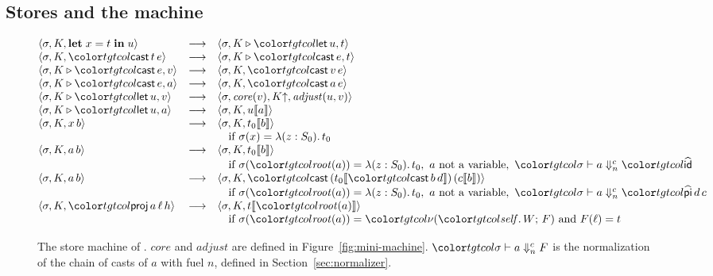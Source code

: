 \subsection{Stores and the machine}

\begin{figure}
\small
\color{tgtcol}
\[
\begin{array}{@{}lcll@{}}
\mst{\sigma}{K}{\klet x = t \kin u} &\step& \mst{\sigma}{K \triangleright \ev{let}\,u}{t} \\
\mst{\sigma}{K}{\ev{cast}\,t\,e} &\step& \mst{\sigma}{K \triangleright \ev{cast}\,e}{t} \\
\mst{\sigma}{K \triangleright \ev{cast}\,e}{v} &\step& \mst{\sigma}{K}{\ev{cast}\,v\,e} \\
\mst{\sigma}{K \triangleright \ev{cast}\,e}{a} &\step& \mst{\sigma}{K}{\ev{cast}\,a\,e} \\
\mst{\sigma}{K \triangleright \ev{let}\,u}{v} &\step& \mst{\sigma, \mathit{core}(v)}{\weak{K}}{\mathit{adjust}(u, v)} \\
\mst{\sigma}{K \triangleright \ev{let}\,u}{a} &\step& \mst{\sigma}{K}{\inst{u}{a}} \\
\mst{\sigma}{K}{x\,b} &\step& \mst{\sigma}{K}{\inst{t_0}{b}} \\
& & \quad \text{if } \sigma(x) = \lambda(z : S_0).\,t_0 \\
\mst{\sigma}{K}{a\,b} &\step& \mst{\sigma}{K}{\inst{t_0}{b}} \\
& & \quad \text{if } \sigma(\rt{a}) = \lambda(z : S_0).\,t_0,\ a \text{ not a variable},\ \chn{\sigma}{a}{n}{\form{id}} \\
\mst{\sigma}{K}{a\,b} &\step& \mst{\sigma}{K}{\ev{cast}\,(\inst{t_0}{\ev{cast}\,b\,d})\,(\inst{c}{b})} \\
& & \quad \text{if } \sigma(\rt{a}) = \lambda(z : S_0).\,t_0,\ a \text{ not a variable},\ \chn{\sigma}{a}{n}{\form{pi}\,d\,c} \\
\mst{\sigma}{K}{\ev{proj}\,a\,\ell\,h} &\step& \mst{\sigma}{K}{\inst{t}{\rt{a}}} \\
& & \quad \text{if } \sigma(\rt{a}) = \lit{W}{F} \text{ and } F(\ell) = t
\end{array}
\]
\color{black}
\caption{The store machine of \FCdot. $\mathit{core}$ and $\mathit{adjust}$ are defined in Figure~\ref{fig:mini-machine}. $\chn{\sigma}{a}{n}{F}$ is the normalization of the chain of casts of $a$ with fuel $n$, defined in Section~\ref{sec:normalizer}.}
\label{fig:machine}
\end{figure}

